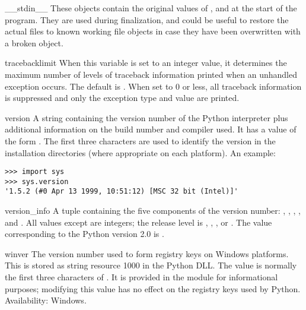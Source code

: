 \begin{datadesc}{__stdin__}
These objects contain the original values of ,
 and  at the start of the program.  They are 
used during finalization, and could be useful to restore the actual
files to known working file objects in case they have been overwritten
with a broken object.
\end{datadesc}

\begin{datadesc}{tracebacklimit}
When this variable is set to an integer value, it determines the
maximum number of levels of traceback information printed when an
unhandled exception occurs.  The default is .  When set to
0 or less, all traceback information is suppressed and only the
exception type and value are printed.
\end{datadesc}

\begin{datadesc}{version}
A string containing the version number of the Python interpreter plus
additional information on the build number and compiler used.  It has
a value of the form .  The first
three characters are used to identify the version in the installation
directories (where appropriate on each platform).  An example:

\begin{verbatim}
>>> import sys
>>> sys.version
'1.5.2 (#0 Apr 13 1999, 10:51:12) [MSC 32 bit (Intel)]'
\end{verbatim}
\end{datadesc}

\begin{datadesc}{version_info}
A tuple containing the five components of the version number:
, , , , and
.  All values except  are integers; the
release level is , ,
, or .  The  value
corresponding to the Python version 2.0 is
.
\end{datadesc}

\begin{datadesc}{winver}
The version number used to form registry keys on Windows platforms.
This is stored as string resource 1000 in the Python DLL.  The value
is normally the first three characters of .  It is
provided in the  module for informational purposes;
modifying this value has no effect on the registry keys used by
Python.
Availability: Windows.
\end{datadesc}

